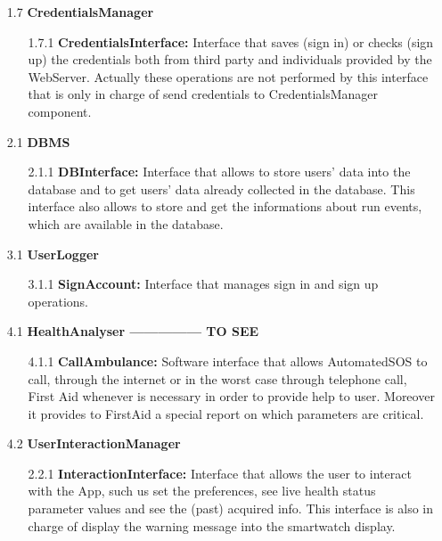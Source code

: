 \begin{enumerate}
\item[1.7] \textbf{CredentialsManager}
	\begin{enumerate}
		\item[1.7.1] \textbf{CredentialsInterface:} Interface that saves (sign in) or checks (sign up) the credentials both from third party and individuals provided by the WebServer. Actually these operations are not performed by this interface that is only in charge of send credentials to CredentialsManager component.
	\end{enumerate}

\item[2.1] \textbf{DBMS}
	\begin{enumerate}
		\item[2.1.1] \textbf{DBInterface:} Interface that allows to store users' data into the database and to get users' data already collected in the database. This interface also allows to store and get the informations about run events, which are available in the database.
	\end{enumerate}
	
\item[3.1] \textbf{UserLogger}
	\begin{enumerate}
		\item[3.1.1] \textbf{SignAccount:} Interface that manages sign in and sign up operations.
	\end{enumerate}
	
\item[4.1] \textbf{HealthAnalyser  --------------- TO SEE}
	\begin{enumerate}
		\item[4.1.1] \textbf{CallAmbulance:} Software interface that allows AutomatedSOS to call, through the internet or in the worst case through telephone call, First Aid whenever is necessary in order to provide help to user. Moreover it provides to FirstAid a special report on which parameters are critical.	
	\end{enumerate}
\item[4.2] \textbf{UserInteractionManager}
	\begin{enumerate}
		\item[2.2.1] \textbf{InteractionInterface:} Interface that allows the user to interact with the App, such us set the preferences, see live health status parameter values and see the (past) acquired info. This interface is also in charge of display the warning message into the smartwatch display.
	\end{enumerate}	
	

\end{enumerate}
